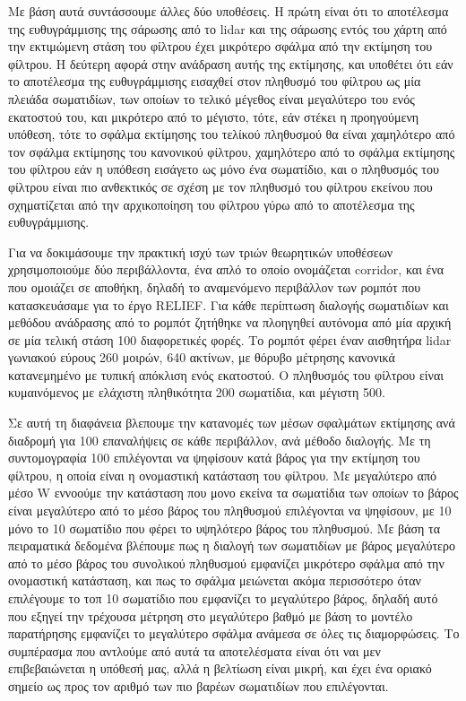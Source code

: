 \documentclass[a4paper,10pt]{article}
\begin{document}
Με βάση αυτά συντάσσουμε άλλες δύο υποθέσεις. Η πρώτη είναι ότι το αποτέλεσμα
της ευθυγράμμισης της σάρωσης από το lidar και της σάρωσης εντός του χάρτη από
την εκτιμώμενη στάση του φίλτρου έχει μικρότερο σφάλμα από την εκτίμηση του
φίλτρου.  Η δεύτερη αφορά στην ανάδραση αυτής της εκτίμησης, και υποθέτει ότι
εάν το αποτέλεσμα της ευθυγράμμισης εισαχθεί στον πληθυσμό του φίλτρου ως
μία πλειάδα σωματιδίων, των οποίων το τελικό μέγεθος είναι μεγαλύτερο του ενός
εκατοστού του, και μικρότερο από το μέγιστο, τότε, εάν στέκει η προηγούμενη
υπόθεση, τότε το σφάλμα εκτίμησης του τελίκού πληθυσμού θα είναι χαμηλότερο
από τον σφάλμα εκτίμησης του κανονικού φίλτρου, χαμηλότερο από το σφάλμα
εκτίμησης του φίλτρου εάν η υπόθεση εισάγετο ως μόνο ένα σωματίδιο, και
ο πληθυσμός του φίλτρου είναι πιο ανθεκτικός σε σχέση με τον πληθυσμό του
φίλτρου εκείνου που σχηματίζεται από την αρχικοποίηση του φίλτρου γύρω από το
αποτέλεσμα της ευθυγράμμισης.


Για να δοκιμάσουμε την πρακτική ισχύ των τριών θεωρητικών υποθέσεων
χρησιμοποιούμε δύο περιβάλλοντα, ένα απλό το οποίο ονομάζεται corridor, και ένα
που ομοιάζει σε αποθήκη, δηλαδή το αναμενόμενο περιβάλλον των ρομπότ που
κατασκευάσαμε για το έργο RELIEF. Για κάθε περίπτωση διαλογής σωματιδίων και
μεθόδου ανάδρασης από το ρομπότ ζητήθηκε να πλοηγηθεί αυτόνομα από μία αρχική
σε μία τελική στάση 100 διαφορετικές φορές. Το ρομπότ φέρει έναν αισθητήρα
lidar γωνιακού εύρους 260 μοιρών, 640 ακτίνων, με θόρυβο μέτρησης κανονικά
κατανεμημένο με τυπική απόκλιση ενός εκατοστού. Ο πληθυσμός του φίλτρου
είναι κυμαινόμενος με ελάχιστη πληθικότητα 200 σωματίδια, και μέγιστη 500.

Σε αυτή τη διαφάνεια βλεπουμε την κατανομές των μέσων σφαλμάτων εκτίμησης ανά
διαδρομή για 100 επαναλήψεις σε κάθε περιβάλλον, ανά μέθοδο διαλογής. Με τη
συντομογραφία 100%
επιλέγονται να ψηφίσουν κατά βάρος για την εκτίμηση του φίλτρου, η οποία είναι
η ονομαστική κατάσταση του φίλτρου. Με μεγαλύτερο από μέσο W εννοούμε την
κατάσταση που μονο εκείνα τα σωματίδια των οποίων το βάρος είναι μεγαλύτερο από
το μέσο βάρος του πληθυσμού επιλέγονται να ψηφίσουν, με 10%
μόνο το 10%
σωματίδιο που φέρει το υψηλότερο βάρος του πληθυσμού. Με βάση τα πειραματικά
δεδομένα βλέπουμε πως η διαλογή των σωματιδίων με βάρος μεγαλύτερο από το μέσο
βάρος του συνολικού πληθυσμού εμφανίζει μικρότερο σφάλμα από την ονομαστική
κατάσταση, και πως το σφάλμα μειώνεται ακόμα περισσότερο όταν επιλέγουμε το τοπ
10%
σωματίδιο που εμφανίζει το μεγαλύτερο βάρος, δηλαδή αυτό που εξηγεί την
τρέχουσα μέτρηση στο μεγαλύτερο βαθμό με βάση το μοντέλο παρατήρησης εμφανίζει
το μεγαλύτερο σφάλμα ανάμεσα σε όλες τις διαμορφώσεις. Το συμπέρασμα που αντλούμε
από αυτά τα αποτελέσματα είναι ότι ναι μεν επιβεβαιώνεται η υπόθεσή μας, αλλά
η βελτίωση είναι μικρή, και έχει ένα οριακό σημείο ως προς τον αριθμό των
πιο βαρέων σωματιδίων που επιλέγονται.
\end{document}
